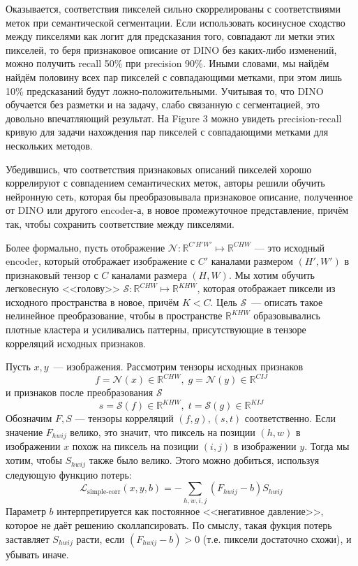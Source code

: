     Оказывается, соответствия пикселей сильно скоррелированы с соответствиями меток при семантической сегментации.
    Если использовать косинусное сходство между пикселями как логит для предсказания того, совпадают ли метки этих пикселей,
    то беря признаковое описание от DINO без каких-либо изменений, можно получить recall 50\% при precision 90\%.
    Иными словами, мы найдём найдём половину всех пар пикселей с совпадающими метками, при этом лишь 10\% предсказаний будут ложно-положительными.
    Учитывая то, что DINO обучается без разметки и на задачу, слабо связанную с сегментацией, это довольно впечатляющий результат.
    На Figure 3 можно увидеть precision-recall кривую для задачи нахождения пар пикселей с совпадающими метками для нескольких методов.

    Убедившись, что соответствия признаковых описаний пикселей хорошо коррелируют с совпадением семантических меток, авторы решили обучить нейронную сеть, 
    которая бы преобразовывала признаковое описание, полученное от DINO или другого encoder-а, в новое промежуточное представление,
    причём так, чтобы сохранить соответствие между пикселями.

    Более формально, пусть отображение $\mathcal{N}\colon \mathbb{R}^{C' H' W'} \mapsto \mathbb{R}^{C H W}$ --- это исходный encoder,
    который отображает изображение с $C'$ каналами размером $(H', W')$ в признаковый тензор с $C$ каналами размера $(H, W)$.
    Мы хотим обучить легковесную <<голову>> $\mathcal{S}\colon \mathbb{R}^{C H W} \mapsto \mathbb{R}^{K H W}$, 
    которая отображает пиксели из исходного пространства в новое, причём $K < C$.
    Цель $\mathcal{S}$~--- описать такое нелинейное преобразование, чтобы в пространстве $\mathbb{R}^{K H W}$
    образовывались плотные кластера и усиливались паттерны, присутствующие в тензоре корреляций исходных признаков.

    Пусть $x, y$~--- изображения. Рассмотрим тензоры исходных признаков
    \begin{equation}
        f = \mathcal{N}(x) \in \mathbb{R}^{CHW}, \; g = \mathcal{N}(y) \in \mathbb{R}^{CIJ}
    \end{equation}
    и признаков после преобразования $\mathcal{S}$
    \begin{equation}
        s = \mathcal{S}(f) \in \mathbb{R}^{KHW}, \; t = \mathcal{S}(g) \in \mathbb{R}^{KIJ}
    \end{equation}
    Обозначим $F, S$ ---  тензоры корреляций $(f, g), (s, t)$ соответственно.
    Если значение $F_{hwij}$ велико, это значит, что пиксель на позиции $(h,w)$ в изображении $x$ похож на пиксель на позиции $(i,j)$ в изображении $y$.
    Тогда мы хотим, чтобы $S_{hwij}$ также было велико.
    Этого можно добиться, используя следующую функцию потерь:
    \begin{equation}
        \mathcal{L}_\text{simple-corr}(x, y, b) = -\sum_{h, w, i, j} (F_{hwij} - b) S_{hwij}
    \end{equation}
    Параметр $b$ интерпретируется как постоянное <<негативное давление>>, которое не даёт решению сколлапсировать.
    По смыслу, такая фукция потерь заставляет $S_{hwij}$ расти, если $(F_{hwij} - b) > 0$ (т.е. пиксели достаточно схожи), и убывать иначе.

